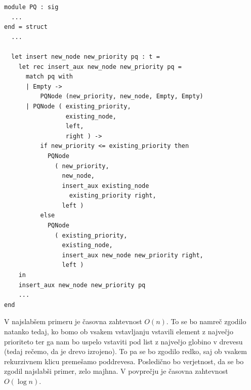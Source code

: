 \documentclass[mat1, tisk]{fmfdelo}
\begin{document}
\begin{lstlisting}[label=lst:pq_insert]
module PQ : sig
  ...
end = struct
  ...

  let insert new_node new_priority pq : t =
    let rec insert_aux new_node new_priority pq =
      match pq with
      | Empty -> 
          PQNode (new_priority, new_node, Empty, Empty)
      | PQNode ( existing_priority, 
                 existing_node, 
                 left, 
                 right ) ->
          if new_priority <= existing_priority then
            PQNode
              ( new_priority,
                new_node,
                insert_aux existing_node 
                  existing_priority right,
                left )
          else
            PQNode
              ( existing_priority,
                existing_node,
                insert_aux new_node new_priority right,
                left )
    in
    insert_aux new_node new_priority pq
    ...
end
\end{lstlisting}

V najslabšem primeru je časovna zahtevnost $O(n)$. To se bo namreč zgodilo natanko tedaj, ko bomo ob vsakem vstavljanju
vstavili element z največjo prioriteto ter ga nam bo uspelo vstaviti pod list z največjo globino v drevesu (tedaj
rečemo, da je drevo izrojeno). To pa se bo zgodilo redko, saj ob vsakem rekurzivnem klicu premešamo poddrevesa.
Posledično bo verjetnost, da se bo zgodil najslabši primer, zelo majhna. V povprečju je časovna zahtevnost $O(\log n)$.
\end{document}
